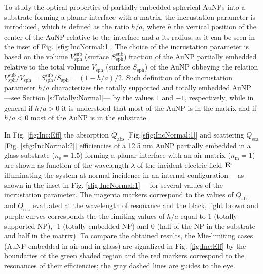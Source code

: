 
To study the optical properties of partially embedded spherical AuNPs into a substrate forming a planar interface with a matrix, the incrustation parameter is introduced, which is defined as the ratio $h/a$, where $h$ the vertical position of the center of the AuNP relative to the interface and $a$ its radius, as it can be seen in the inset of Fig. \ref{sfig:IncNormal:1}. The choice of the incrustation parameter is based on the volume $V_\text{sph}^\text{sub}$ (surface $S_\text{sph}^\text{sub}$) fraction of the
AuNP partially embedded relative to the total volume $V_\text{sph}$ (surface $S_\text{sph}$) of the AuNP   obbeying the relation $V_\text{sph}^\text{sub}/V_\text{sph} = S_\text{sph}^\text{sub}/S_\text{sph} = (1-h/a)/2$. Such definition of the incrustation parameter $h/a$ characterizes the totally supported and totally embedded AuNP  ---see Section \ref{s:Totally:Normal}--- by the values $1$ and $-1$, respectively, while in general  if $h/a>0$ it is understood that most of the AuNP is in the matrix and if $h/a<0$ most of the AuNP is in the substrate.

In Fig. \ref{fig:Inc:Eff} the absorption $Q_\text{abs}$ [Fig.\ref{sfig:IncNormal:1}] and scattering $Q_\text{sca}$ [Fig. \ref{sfig:IncNormal:2}] efficiencies of a 12.5 nm AuNP partially embedded in a glass substrate ($n_\text{s} = 1.5$) forming a planar interface with an air matrix ($n_\text{m} = 1$) are shown as function of the wavelength $\lambda$ of the incident electric field $\vb{E}^\text{i}$ illuminating the system at normal incidence in an internal configuration ---as shown in the inset in Fig. \ref{sfig:IncNormal:1}--- for several values of the incrustation parameter. The magenta markers correspond to the values of $Q_\text{abs}$ and $Q_\text{sca}$ evaluated at the wavelength of resonance and the black, light brown and purple curves corresponds the the limiting values of $h/a$ equal to 1 (totally supported NP), -1 (totally embedded NP) and 0 (half of the NP in the substrate and half in the matrix). To compare the obtained results, the Mie-limiting cases (AuNP embedded in air and in glass)  are signalized in Fig. \ref{fig:Inc:Eff} by the boundaries of the green shaded region  and the red markers correspond to the resonances of their efficiencies; the gray dashed lines are guides to the eye.

